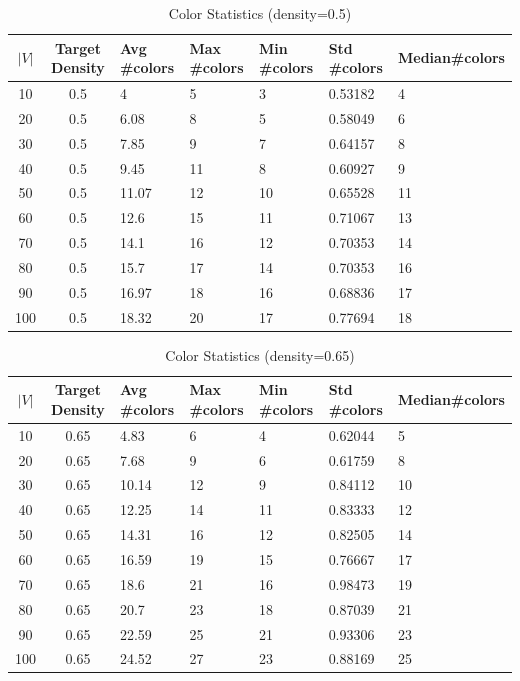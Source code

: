 \documentclass[paper=a4, fontsize=11pt]{scrartcl} %
\numberwithin{equation}{section} %
\numberwithin{figure}{section} %
\numberwithin{table}{section} %
\begin{document}
\begin{table}[H]
    \centering
    \begin{tabular}{cclllll}
    \toprule
$|V|$ & Target Density & Avg \#colors & Max \#colors &  Min \#colors & Std \#colors & Median\#colors\\ 
       \midrule
10 & 0.5 & 4 & 5 & 3 & 0.53182 & 4\\ 
20 & 0.5 & 6.08 & 8 & 5 & 0.58049 & 6\\ 
30 & 0.5 & 7.85 & 9 & 7 & 0.64157 & 8\\ 
40 & 0.5 & 9.45 & 11 & 8 & 0.60927 & 9\\ 
50 & 0.5 & 11.07 & 12 & 10 & 0.65528 & 11\\ 
60 & 0.5 & 12.6 & 15 & 11 & 0.71067 & 13\\ 
70 & 0.5 & 14.1 & 16 & 12 & 0.70353 & 14\\ 
80 & 0.5 & 15.7 & 17 & 14 & 0.70353 & 16\\ 
90 & 0.5 & 16.97 & 18 & 16 & 0.68836 & 17\\ 
100 & 0.5 & 18.32 & 20 & 17 & 0.77694 & 18\\ 
      \bottomrule
    \end{tabular}
    \caption{Color Statistics (density=0.5)}
    \label{tab:colors(density=0.5)}
\end{table}

\begin{table}[H]
    \centering
    \begin{tabular}{cclllll}
    \toprule
$|V|$ & Target Density & Avg \#colors & Max \#colors &  Min \#colors & Std \#colors & Median\#colors\\ 
       \midrule
10 & 0.65 & 4.83 & 6 & 4 & 0.62044 & 5\\ 
20 & 0.65 & 7.68 & 9 & 6 & 0.61759 & 8\\ 
30 & 0.65 & 10.14 & 12 & 9 & 0.84112 & 10\\ 
40 & 0.65 & 12.25 & 14 & 11 & 0.83333 & 12\\ 
50 & 0.65 & 14.31 & 16 & 12 & 0.82505 & 14\\ 
60 & 0.65 & 16.59 & 19 & 15 & 0.76667 & 17\\ 
70 & 0.65 & 18.6 & 21 & 16 & 0.98473 & 19\\ 
80 & 0.65 & 20.7 & 23 & 18 & 0.87039 & 21\\ 
90 & 0.65 & 22.59 & 25 & 21 & 0.93306 & 23\\ 
100 & 0.65 & 24.52 & 27 & 23 & 0.88169 & 25\\
      \bottomrule
    \end{tabular}
    \caption{Color Statistics (density=0.65)}
    \label{tab:colors(density=0.65)}
\end{table}
\end{document}
